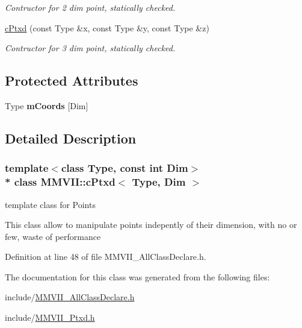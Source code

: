 \begin{DoxyCompactItemize}
\begin{DoxyCompactList}\small\item\em Contructor for 2 dim point, statically checked. \end{DoxyCompactList}\item 
\hyperlink{classMMVII_1_1cPtxd_ae3d442db4c63f6e3083bfe6665b2ea4d}{c\+Ptxd} (const Type \&x, const Type \&y, const Type \&z)\hypertarget{classMMVII_1_1cPtxd_ae3d442db4c63f6e3083bfe6665b2ea4d}{}\label{classMMVII_1_1cPtxd_ae3d442db4c63f6e3083bfe6665b2ea4d}

\begin{DoxyCompactList}\small\item\em Contructor for 3 dim point, statically checked. \end{DoxyCompactList}\end{DoxyCompactItemize}
\subsection*{Protected Attributes}
\begin{DoxyCompactItemize}
\item 
Type {\bfseries m\+Coords} \mbox{[}Dim\mbox{]}\hypertarget{classMMVII_1_1cPtxd_afc8b80b0f50e55dc0c7f1ccfc2a37c2e}{}\label{classMMVII_1_1cPtxd_afc8b80b0f50e55dc0c7f1ccfc2a37c2e}

\end{DoxyCompactItemize}


\subsection{Detailed Description}
\subsubsection*{template$<$class Type, const int Dim$>$\\*
class M\+M\+V\+I\+I\+::c\+Ptxd$<$ Type, Dim $>$}

template class for Points 

This class allow to manipulate points indepently of their dimension, with no or few, waste of performance 

Definition at line 48 of file M\+M\+V\+I\+I\+\_\+\+All\+Class\+Declare.\+h.



The documentation for this class was generated from the following files\+:\begin{DoxyCompactItemize}
\item 
include/\hyperlink{MMVII__AllClassDeclare_8h}{M\+M\+V\+I\+I\+\_\+\+All\+Class\+Declare.\+h}\item 
include/\hyperlink{MMVII__Ptxd_8h}{M\+M\+V\+I\+I\+\_\+\+Ptxd.\+h}\end{DoxyCompactItemize}
